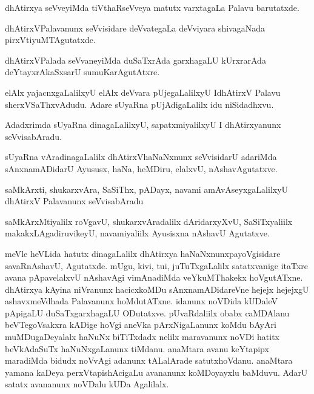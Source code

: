 \documentclass{article}
\begin{document}
\begin{mng}%
dhAtirxya seVveyiMda tiVthaRseVveya matutx varxtagaLa Palavu 
barutatxde.
\end{mng}

\begin{mng}%
dhAtirxVPalavanunx seVvisidare deVvategaLa deVviyara shivagaNada 
pirxVtiyuMTAgutatxde.
\end{mng}

\begin{mng}%
dhAtirxVPalada seVvaneyiMda duSaTxrAda garxhagaLU kUrxrarAda 
deYtayxrAkaSxsarU sumuKarAgutAtxre.
\end{mng}

\begin{mng}%
elAlx yajacnxgaLalilxyU elAlx deVvara pUjegaLalilxyU IdhAtirxV Palavu 
sherxVSaThxvAdudu. Adare sUyaRna pUjAdigaLalilx idu niSidadhxvu.
\end{mng}

\begin{mng}%
Adadxrimda sUyaRna dinagaLalilxyU, sapatxmiyalilxyU I dhAtirxyanunx 
seVvisabAradu.
\end{mng}

\begin{mng}%
sUyaRna vAradinagaLalilx dhAtirxVhaNaNxnunx seVvisidarU adariMda 
sAnxnamADidarU Ayususx, haNa, heMDiru, elalxvU, nAshavAgutatxve.
\end{mng}

\begin{mng}%
saMkArxti, shukarxvAra, SaSiThx, pADayx, navami amAvAseyxgaLalilxyU 
dhAtirxV Palavanunx seVvisabAradu
\end{mng}

\begin{mng}%
saMkArxMtiyalilx roVgavU, shukarxvAradalilx dAridarxyXvU, 
SaSiTxyaliilx makakxLAgadiruvikeyU, navamiyaliilx Ayusisxna nAshavU 
Agutatxve.
\end{mng}

\begin{mng}%
meVle heVLida hatutx dinagaLalilx dhAtirxya haNaNxnunxpayoVgisidare 
savaRnAshavU, Agutatxde. mUgu, kivi, tui, juTuTxgaLalilx satatxvanige 
itaTxre avana pApavelalxvU nAshavAgi vimAnadiMda veYkuMThakekx 
hoVgutATxne. dhAtirxya kAyina niVranunx hacicxkoMDu sAnxnamADidareVne 
hejejx hejejxgU ashavxmeVdhada Palavanunx hoMdutATxne. idanunx noVDida 
kUDaleV pApigaLU duSaTxgarxhagaLU ODutatxve. pUvaRdaliilx obabx 
caMDAlanu beVTegoVsakxra kADige hoVgi aneVka pArxNigaLanunx koMdu 
bAyAri muMDugaDeyalalx haNuNx biTiTxdadx nelilx maravanunx noVDi 
hatitx beVkAdaSuTx haNuNxgaLanunx tiMdanu. anaMtara avanu keYtapipx 
maradiMda bidudx noVvAgi adanunx tALalArade satutxhoVdanu. anaMtara 
yamana kaDeya perxVtapishAcigaLu avananunx koMDoyayxlu baMduvu. AdarU 
satatx avananunx noVDalu kUDa Agalilalx.
\end{mng}
\end{document}
